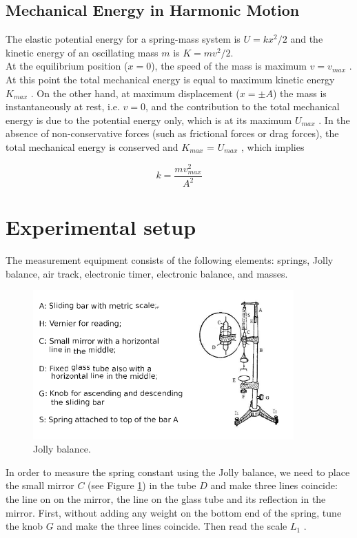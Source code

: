 \documentclass{article}
\begin{document}
\subsection{Mechanical Energy in Harmonic Motion}

The elastic potential energy for a spring-mass system is $U=kx^2/2$ and the kinetic
energy of an oscillating mass $m$ is $K=mv^2/2$.\\

At the equilibrium position ($x=0$), the speed of the mass is maximum $v=v_{max}$ .
At this point the total mechanical energy is equal to maximum kinetic energy $K_{max}$ . On
the other hand, at maximum displacement ($x=\pm A$) the mass is instantaneously at rest,
i.e. $v=0$, and the contribution to the total mechanical energy is due to the potential
energy only, which is at its maximum $U_{max}$ . In the absence of non-conservative forces
(such as frictional forces or drag forces), the total mechanical energy is conserved and
$K_{max}$ = $U_{max}$ , which implies

\begin{equation}\label{eq-5}
k=\frac{mv_{max}^2}{A^2}
\end{equation}

\section{Experimental setup}

The measurement equipment consists of the following elements: springs, Jolly balance,
air track, electronic timer, electronic balance, and masses.\\

\begin{figure}[!t]
	\centering
	\includegraphics[width=10cm]{fig-2.png}
	\caption{Jolly balance.
	\label{fig-2}}
\end{figure}

In order to measure the spring constant using the Jolly balance, we need to place the
small mirror $C$ (see Figure \ref{fig-2}) in the tube $D$ and make three lines coincide: the line on
on the mirror, the line on the glass tube and its reflection in the mirror. First, without
adding any weight on the bottom end of the spring, tune the knob $G$ and make the three
lines coincide. Then read the scale $L_1$ .\\
\end{document}
